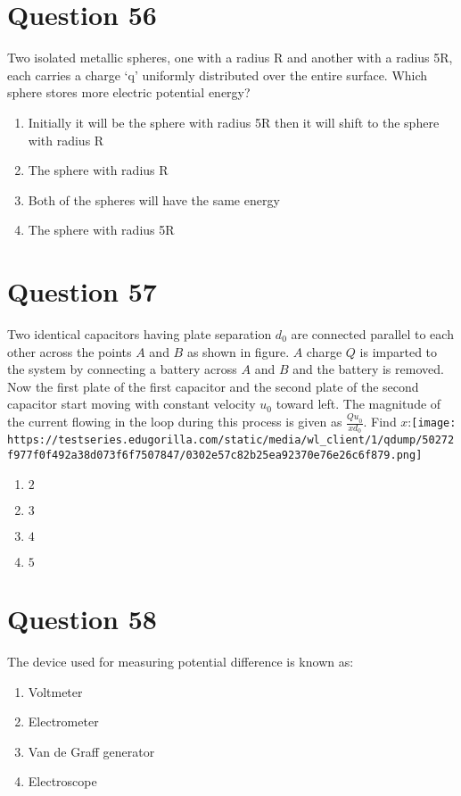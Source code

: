 \documentclass{article}
\begin{document}
\section*{Question 56}
Two isolated metallic spheres, one with a radius R and another with a radius 5R, each carries a charge ‘q’ uniformly distributed over the entire surface. Which sphere stores more electric potential energy?
\begin{enumerate}[label=(\alph*)]
\item Initially it will be the sphere with radius 5R then it will shift to the sphere with radius R\newline
\item The sphere with radius R
\item Both of the spheres will have the same energy
\item The sphere with radius 5R\newline
\end{enumerate}
\newpage
\section*{Question 57}
Two identical capacitors having plate separation \({d}_{0}\) are connected parallel to each other across the points \(A\) and \(B\) as shown in figure. \(A\) charge \(Q\) is imparted to the system by connecting a battery across \(A\) and \(B\) and the battery is removed. Now the first plate of the first capacitor and the second plate of the second capacitor start moving with constant velocity \(u_{0}\) toward left. The magnitude of the current flowing in the loop during this process is given as \(\frac{{Qu}_{0}}{{xd}_{0}}\). Find \({x}\):\texttt{[image: https://testseries.edugorilla.com/static/media/wl\_client/1/qdump/50272f977f0f492a38d073f6f7507847/0302e57c82b25ea92370e76e26c6f879.png]}
\begin{enumerate}[label=(\alph*)]
\item \(2\)
\item \(3\)\newline
\item \(4\)\newline
\item \(5\)\newline
\end{enumerate}
\newpage
\section*{Question 58}
The device used for measuring potential difference is known as:
\begin{enumerate}[label=(\alph*)]
\item Voltmeter\newline
\item Electrometer
\item Van de Graff generator
\item Electroscope
\end{enumerate}
\newpage
\end{document}
